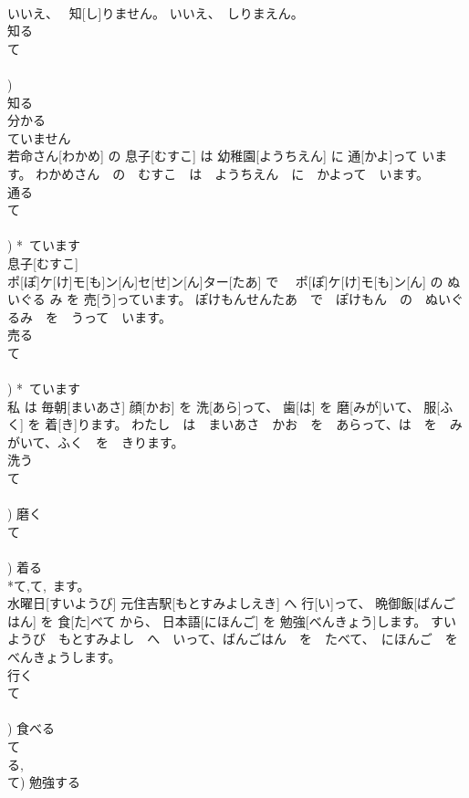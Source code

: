 \documentclass[8pt]{extreport}
\begin{document}
\begin{CJK}{UTF8}{min}
\\	いいえ、　 知[し]りません。	いいえ、　しりまえん。	
\\	知る 
\\	て 
\\	[る/つ/う] 
\\	[って])	
\\	知る 
\\	分かる 
\\	ていません 
\\	若命さん[わかめ] の 息子[むすこ] は 幼稚園[ようちえん] に 通[かよ]って います。	わかめさん　の　むすこ　は　ようちえん　に　かよって　います。	
\\	通る 
\\	て 
\\	[る/つ/う] 
\\	[って])	*~ています 
\\	息子[むすこ] 
\\	ポ[ぽ]ケ[け]モ[も]ン[ん]セ[せ]ン[ん]ター[たあ] で　 ポ[ぽ]ケ[け]モ[も]ン[ん] の ぬいぐる み を 売[う]っています。	ぽけもんせんたあ　で　ぽけもん　の　ぬいぐるみ　を　うって　います。	
\\	売る 
\\	て 
\\	[る/つ/う] 
\\	[って])	*~ています 
\\	私 は 毎朝[まいあさ] 顔[かお] を 洗[あら]って、 歯[は] を 磨[みが]いて、 服[ふく] を 着[き]ります。	わたし　は　まいあさ　かお　を　あらって、は　を　みがいて、ふく　を　きります。	
\\	洗う 
\\	て 
\\	[る/つ/う] 
\\	[って])	磨く 
\\	て 
\\	[く/ぐ] 
\\	[いて/いで])	着る 
\\	*て,て,~ます。 
\\	水曜日[すいようび] 元住吉駅[もとすみよしえき] へ 行[い]って、 晩御飯[ばんごはん] を 食[た]べて から、 日本語[にほんご] を 勉強[べんきょう]します。	すいようび　もとすみよし　へ　いって、ばんごはん　を　たべて、　にほんご　を　べんきょうします。	
\\	行く 
\\	て 
\\	[く] 
\\	[って])	食べる 
\\	て 
\\	る, 
\\	て)	勉強する 

\end{CJK}
\end{document}
